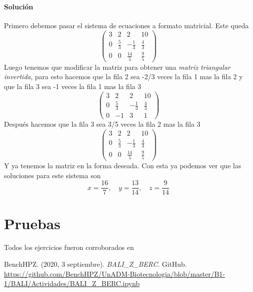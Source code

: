 \documentclass[12pt]{article}
\begin{document}
    \paragraph{Soluci\'on} Primero debemos pasar el sistema de ecuaciones a formato matricial. Este queda
    $$\left(\begin{array}{rrrr}
		3 & 2 & 2 & 10 \\
		0 & \frac{5}{3} & -\frac{1}{3} & \frac{4}{3} \\
		0 & 0 & \frac{14}{5} & \frac{9}{5}
	\end{array}\right)$$
	Luego tenemos que modificar la matriz para obtener una \textit{matriz triangular invertida}, para esto hacemos que la fila 2 sea -2/3 veces la fila 1 mas la fila 2 y que la fila 3 sea -1 veces la fila 1 mas la fila 3
	$$\left(\begin{array}{rrrr}
		3 & 2 & 2 & 10 \\
		0 & \frac{5}{3} & -\frac{1}{3} & \frac{4}{3} \\
		0 & -1 & 3 & 1
	\end{array}\right)$$
	Despu\'es  hacemos que la fila 3 sea 3/5 veces la fila 2 mas la fila 3
	$$\left(\begin{array}{rrrr}
		3 & 2 & 2 & 10 \\
		0 & \frac{5}{3} & -\frac{1}{3} & \frac{4}{3} \\
		0 & 0 & \frac{14}{5} & \frac{9}{5}
	\end{array}\right)$$
	Y ya tenemos la matriz en la forma deseada. Con esta ya podemos ver que las soluciones para este sistema son
	$$ x = \frac{16}{7}, \quad y = \frac{13}{14}, \quad z = \frac{9}{14}$$


\section*{Pruebas}
	\par Todos los ejercicios fueron corroborados en \cite{github}

\newpage
\begin{thebibliography}{X}
	 BenchHPZ. (2020, 3 septiembre). \textit{BALI\_Z\_BERC}. GitHub. \url{https://github.com/BenchHPZ/UnADM-Biotecnologia/blob/master/B1-1/BALI/Actividades/BALI_Z_BERC.ipynb}
\end{thebibliography}
\end{document}
